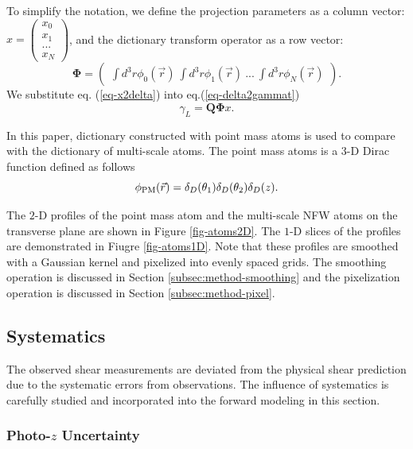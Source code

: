 \documentclass[twocolumn]{aastex62}
\begin{document}
To simplify the notation, we define the projection parameters as a column vector:
$x=\begin{pmatrix}
x_{0}\\
x_{1}\\
...\\
x_{N}
\end{pmatrix}$,
and the dictionary transform operator as a row vector:
\begin{equation}
\mathbf{\Phi}=\begin{pmatrix}
\int d^3r\phi_0(\vec{r}) ~\int d^3r \phi_1(\vec{r})~ ...~\int d^3r \phi_{N}(\vec{r})
\end{pmatrix}.
\end{equation}
We substitute eq. (\ref{eq-x2delta}) into eq.(\ref{eq-delta2gammat})
\begin{equation}\label{eq-x2gammat}
\gamma_L=\mathbf{Q}\mathbf{\Phi} x.
\end{equation}

In this paper, dictionary constructed with point mass atoms is used to compare with the dictionary of multi-scale atoms.
The point mass atoms is a $3$-D Dirac function defined as follows
\begin{equation}
\phi_{\rm{PM}}(\vec{r})= \delta_D(\theta_1) \delta_D(\theta_2) \delta_D(z).
\end{equation}

The $2$-D profiles of the point mass atom and the multi-scale NFW atoms on the transverse plane are shown in Figure 
\ref{fig-atoms2D}. The $1$-D slices of the profiles are demonstrated in Fiugre \ref{fig-atoms1D}. Note that these profiles 
are smoothed with a Gaussian kernel and pixelized into evenly spaced grids. The smoothing operation is discussed in 
Section \ref{subsec:method-smoothing} and the pixelization operation is discussed in Section \ref{subsec:method-pixel}.

\subsection{Systematics}
\label{subsec:method-Systematics}

The observed shear measurements are deviated from the physical shear prediction due to the systematic 
errors from observations. The influence of systematics is carefully studied and incorporated into the forward 
modeling in this section.

\subsubsection{Photo-$z$ Uncertainty}
\label{subsec:method-photoz}
\end{document}
